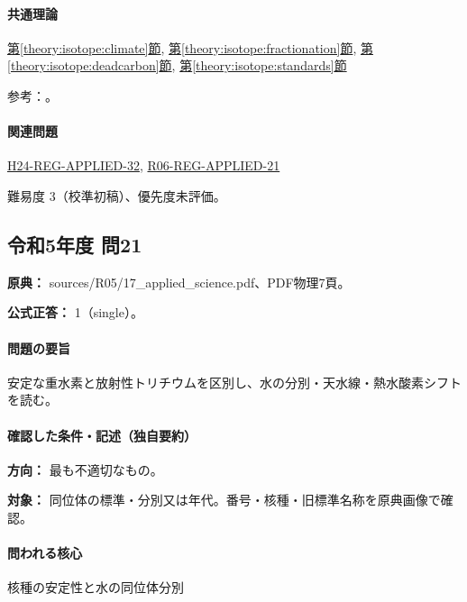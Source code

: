 \paragraph{共通理論} \hyperref[theory:isotope:climate]{第\ref*{theory:isotope:climate}節}, \hyperref[theory:isotope:fractionation]{第\ref*{theory:isotope:fractionation}節}, \hyperref[theory:isotope:deadcarbon]{第\ref*{theory:isotope:deadcarbon}節}, \hyperref[theory:isotope:standards]{第\ref*{theory:isotope:standards}節}

\par 参考：\cite{iso_oxygen,iso_deadcarbon,iso_standards1995,iso_vcdt,iso_hydrothermal}。

\paragraph{関連問題} \hyperref[q:h24-reg-applied-32]{H24-REG-APPLIED-32}, \hyperref[q:r06-reg-applied-21]{R06-REG-APPLIED-21}

\par 難易度 3（校準初稿）、優先度未評価。

\subsection{令和5年度 問21}
\label{q:r05-reg-applied-21}

\noindent\textbf{原典：} sources/R05/17\_applied\_science.pdf、PDF物理7頁。

\textbf{公式正答：} 1（single）。

\paragraph{問題の要旨} 安定な重水素と放射性トリチウムを区別し、水の分別・天水線・熱水酸素シフトを読む。

\paragraph{確認した条件・記述（独自要約）}\mbox{}\par

\noindent\textbf{方向：} 最も不適切なもの。\par

\noindent\textbf{対象：} 同位体の標準・分別又は年代。番号・核種・旧標準名称を原典画像で確認。\par

\paragraph{問われる核心} 核種の安定性と水の同位体分別

